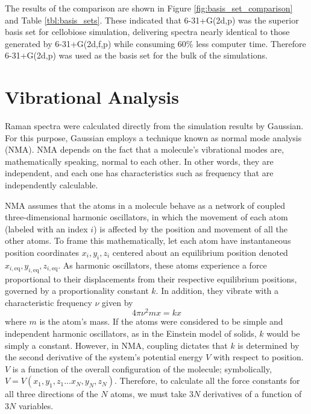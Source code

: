 The results of the comparison are shown in Figure \ref{fig:basis_set_comparison} and Table \ref{tbl:basis_sets}. These indicated that 6-31+G(2d,p) was the superior basis set for cellobiose simulation, delivering spectra nearly identical to those generated by 6-31+G(2d,f,p) while consuming 60\% less computer time. Therefore 6-31+G(2d,p) was used as the basis set for the bulk of the simulations.

\section{Vibrational Analysis}

Raman spectra were calculated directly from the simulation results by Gaussian. For this purpose, Gaussian employs a technique known as normal mode analysis (NMA). NMA depends on the fact that a molecule's vibrational modes are, mathematically speaking, normal to each other. In other words, they are independent, and each one has characteristics such as frequency that are independently calculable.

NMA assumes that the atoms in a molecule behave as a network of coupled three-dimensional harmonic oscillators, in which the movement of each atom (labeled with an index $i$) is affected by the position and movement of all the other atoms. To frame this mathematically, let each atom have instantaneous position coordinates $x_i, y_i, z_i$ centered about an equilibrium position denoted $x_{i,\mathrm{eq}}, y_{i,\mathrm{eq}}, z_{i,\mathrm{eq}}$. As harmonic oscillators, these atoms experience a force proportional to their displacements from their respective equilibrium positions, governed by a proportionality constant $k$. In addition, they vibrate with a characteristic frequency $\nu$ given by
\begin{equation}
\label{freq_eq}
4\pi \nu^2 mx = kx
\end{equation}
where $m$ is the atom's mass. If the atoms were considered to be simple and independent harmonic oscillators, as in the Einstein model of solids\cite{RefWorks:60}, $k$ would be simply a constant. However, in NMA, coupling dictates that $k$ is determined by the second derivative of the system's potential energy $V$ with respect to position. $V$ is a function of the overall configuration of the molecule; symbolically, $V = V(x_1, y_1, z_1 ... x_N, y_N, z_N)$. Therefore, to calculate all the force constants for all three directions of the $N$ atoms, we must take $3N$ derivatives of a function of $3N$ variables.

